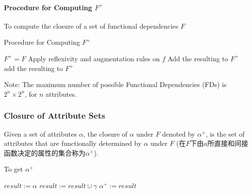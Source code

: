 \paragraph{Procedure for Computing \texorpdfstring{$F^+$}.}
To compute the closure of a set of functional dependencies $F$
\begin{algorithm}[H]
    \caption{Procedure for Computing $F^+$}
    \begin{algorithmic}
        \State $F^+=F$
        \Repeat
                \State Apply reflexivity and augmentation rules on $f$
                \State Add the resulting  to $F^+$
            \EndFor
                    \State add the resulting  to $F^+$
                \EndIf
            \EndFor
    \end{algorithmic}
\end{algorithm}
Note: The maximum number of possible Functional Dependencies (FDs) is $2^n \times 2^n$, for $n$ attributes.

\subsubsection{Closure of Attribute Sets}

\begin{definition}
    Given a set of attributes $\alpha$, the closure of $\alpha$ under $F$ denoted by $\alpha^+$, is the set of attributes that are functionally determined by $\alpha$ under $F$ (在$F$下由$a$所直接和间接函数决定的属性的集合称为$\alpha^+$).
\end{definition}

\begin{algorithm}[H]
    \caption{To get $\alpha^+$}
    \begin{algorithmic}
        \State $result:= \alpha$
                    \State $result := result \cup \gamma$
                \EndIf
            \EndFor
            \State $\alpha^+ := result$
        \EndWhile
    \end{algorithmic}
\end{algorithm}


